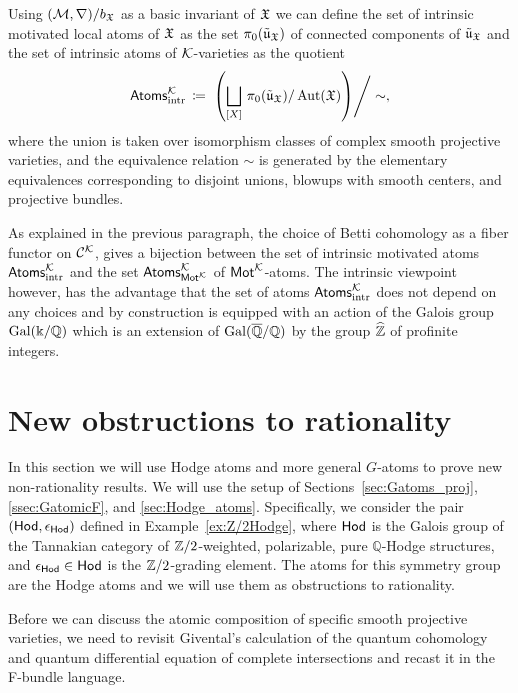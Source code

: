 \documentclass[twoside,leqno]{article}
\numberwithin{equation}{section}
\theoremstyle{plain}
\theoremstyle{definition}
\begin{document}
Using $(\mathcal{M},\nabla)/b_{\mathfrak X}$ as a basic invariant of $\mathfrak X$ we can define the set of 
intrinsic motivated local atoms
of $\mathfrak X$ as the set $\pi_{0}(\tilde{\mathfrak{u}}_{\mathfrak X})$ of connected components of $\tilde{\mathfrak{u}}_{\mathfrak X}$
and the set of intrinsic atoms of $\mathcal K$-varieties as the quotient 
\[
\mathsf{Atoms}_{\operatorname{intr}}^{\mathcal K} \, \coloneqq \, \left.\left( \bigsqcup_{[X]} \, \pi_{0}(\tilde{\mathfrak{u}}_{\mathfrak X})/\operatorname{Aut}(\mathfrak X)\right)\right/\sim, 
\] 
where the union is taken over isomorphism classes of complex smooth projective varieties, and the equivalence relation $\sim$ is generated by the elementary equivalences corresponding to 
disjoint unions, blowups with smooth centers, and projective bundles.


As explained in the previous paragraph, the choice of Betti cohomology as a fiber functor on $\mathcal{C}^{\mathcal K}$, gives a bijection between the  set of intrinsic motivated atoms $\mathsf{Atoms}_{\operatorname{intr}}^{\mathcal K}$ and the set 
$\mathsf{Atoms}_{\mathsf{Mot}^{\mathcal K}}^{\mathcal K}$ of $\mathsf{Mot}^{\mathcal K}$-atoms. The intrinsic viewpoint however, has the advantage  that 
the set of atoms $\mathsf{Atoms}_{\operatorname{intr}}^{\mathcal K}$ does not depend on any choices and by construction is equipped with an action of the Galois group $\operatorname{Gal}(\Bbbk/\mathbb Q)$ which is an extension of $\operatorname{Gal}(\overline{\mathbb Q}/\mathbb Q)$ by the group $\widehat{\mathbb Z}$ of profinite integers.

\section{New obstructions to rationality} \label{sec:obstructions}

In this section we will use Hodge atoms and more general $G$-atoms to prove new non-rationality results. We will use the setup of Sections~\ref{sec:Gatoms_proj}, \ref{ssec:GatomicF}, and \ref{sec:Hodge_atoms}.
Specifically, we consider the pair  $\left(\mathsf{Hod},\epsilon_{\mathsf{Hod}}\right)$ defined in Example~\ref{ex:Z/2Hodge}, where $\mathsf{Hod}$ is the Galois group of the Tannakian category of $\mathbb Z/2$-weighted, polarizable, pure $\mathbb{Q}$-Hodge structures, and $\epsilon_{\mathsf{Hod}} \in \mathsf{Hod}$ is the $\mathbb Z/2$-grading element. The atoms for this symmetry group are the Hodge atoms and we will use them as obstructions to rationality.

Before we can discuss the atomic composition of specific smooth projective varieties, we need to revisit Givental's calculation of the quantum cohomology and quantum differential equation of complete intersections and recast it in the F-bundle language.
\end{document}
